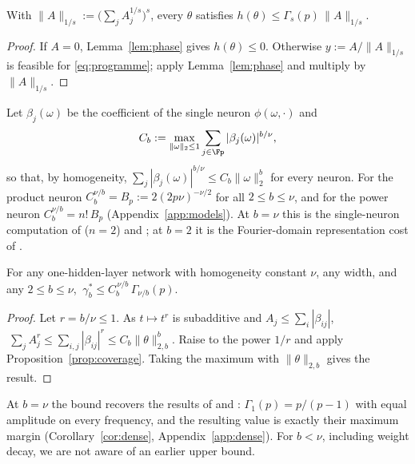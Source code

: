 \begin{proposition}\label{prop:coverage}
With $\|A\|_{1/s}:=\big(\sum_jA_j^{1/s}\big)^s$, every $\theta$ satisfies $h(\theta)\le\Gamma_s(p)\,\|A\|_{1/s}$.
\end{proposition}
\begin{proof}
If $A=0$, Lemma~\ref{lem:phase} gives $h(\theta)\le0$. Otherwise $y:=A/\|A\|_{1/s}$ is feasible for \eqref{eq:programme}; apply Lemma~\ref{lem:phase} and multiply by $\|A\|_{1/s}$.
\end{proof}

Let $\beta_j(\omega)$ be the coefficient of the single neuron $\phi(\omega,\cdot)$ and
\[
C_b:=\max_{\|\omega\|_2\le1}\sum_{j\in\Fp}|\beta_j(\omega)|^{b/\nu},
\]
so that, by homogeneity, $\sum_j|\beta_j(\omega)|^{b/\nu}\le C_b\|\omega\|_2^b$ for every neuron. For the product neuron $C_b^{\nu/b}=B_p:=2(2p\nu)^{-\nu/2}$ for all $2\le b\le\nu$, and for the power neuron $C_b^{\nu/b}=n!\,B_p$ (Appendix~\ref{app:models}). At $b=\nu$ this is the single-neuron computation of \citet[App.~F.1]{morwani2024feature} ($n=2$) and \citet[Lemmas~D.7--D.8]{li2025nsum}; at $b=2$ it is the Fourier-domain representation cost of \citet[Lemma~7]{gunasekar2018implicit}.

\begin{theorem}\label{thm:universal}
For any one-hidden-layer network with homogeneity constant $\nu$, any width, and any $2\le b\le\nu$, $\ \gamma^*_b\le C_b^{\,\nu/b}\,\Gamma_{\nu/b}(p)$.
\end{theorem}
\begin{proof}
Let $r=b/\nu\le1$. As $t\mapsto t^r$ is subadditive and $A_j\le\sum_i|\beta_{ij}|$, $\ \sum_jA_j^r\le\sum_{i,j}|\beta_{ij}|^r\le C_b\|\theta\|_{2,b}^b$. Raise to the power $1/r$ and apply Proposition~\ref{prop:coverage}. Taking the maximum with $\|\theta\|_{2,b}$ gives the result.
\end{proof}

At $b=\nu$ the bound recovers the results of \citet[Thm.~7]{morwani2024feature} and \citet[Thm.~4.1]{li2025nsum}: $\Gamma_1(p)=p/(p-1)$ with equal amplitude on every frequency, and the resulting value is exactly their maximum margin (Corollary~\ref{cor:dense}, Appendix~\ref{app:dense}). For $b<\nu$, including weight decay, we are not aware of an earlier upper bound. 